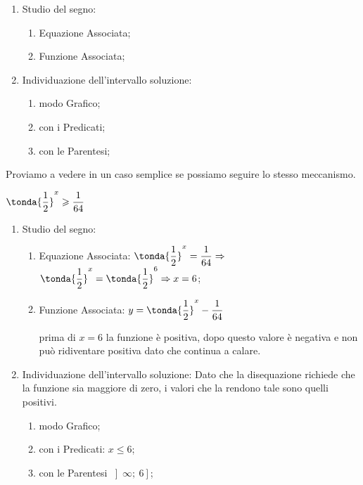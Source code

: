 \begin{enumerate} [noitemsep]
 \item Studio del segno:
 \begin{enumerate} [noitemsep]
  \item Equazione Associata;
  \item Funzione Associata;
 \end{enumerate}
 \item Individuazione dell'intervallo soluzione:
 \begin{enumerate} [noitemsep]
  \item modo Grafico;
  \item con i Predicati;
  \item con le Parentesi;
 \end{enumerate} 
\end{enumerate}

Proviamo a vedere in un caso semplice se possiamo seguire lo stesso meccanismo.

\begin{esempio}
 \(\tonda{\dfrac{1}{2}}^x \geqslant \dfrac{1}{64}\)
 
\begin{enumerate} [noitemsep]
 \item Studio del segno:
 \begin{enumerate} [noitemsep]
  \item Equazione Associata: 
  \(\tonda{\dfrac{1}{2}}^x = \dfrac{1}{64} \Rightarrow\)
   \(\tonda{\dfrac{1}{2}}^x = \tonda{\dfrac{1}{2}}^6 \Rightarrow x= 6\);
  \item Funzione Associata: \(y=\tonda{\dfrac{1}{2}}^x -\dfrac{1}{64}\)
 \begin{inaccessibleblock}
 \end{inaccessibleblock}
 prima di \(x=6\) la funzione è positiva, dopo questo valore è negativa e non 
può ridiventare positiva dato che continua a calare.
 \end{enumerate}
 \item Individuazione dell'intervallo soluzione:
 Dato che la disequazione richiede che la funzione sia maggiore di zero, i 
valori che la rendono tale sono quelli positivi.
 \begin{enumerate} [noitemsep]
  \item modo Grafico;
 \begin{inaccessibleblock}
 \end{inaccessibleblock}
  \item con i Predicati: \(x \leqslant 6\);
  \item con le Parentesi \(\left]\infty;~6\right]\);
 \end{enumerate} 
\end{enumerate}

\end{esempio}

